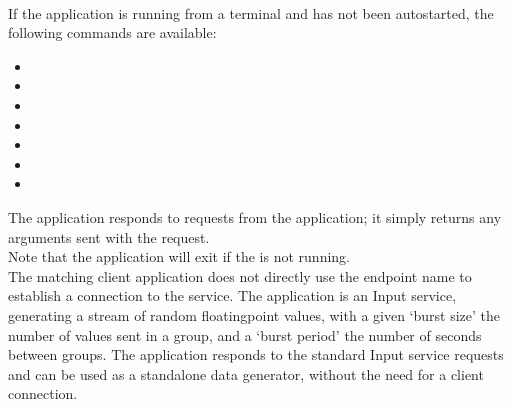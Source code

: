 \insertAppParameters{}
\insertOutputServiceComment{}\\

If the application is running from a terminal and has not been autostarted, the following
commands are available:
\begin{itemize}
\item{}
\item\exSp{}
\item\exSp{}
\item\exSp{}
\item\exSp{}
\item\exSp{}
\item\exSp{}
\end{itemize}
The  application responds to
 requests from the
 application; it simply returns any arguments
sent with the request.\\

Note that the application will exit if the
 is not running.\\

\insertAutoAppParameters{}
The matching client application does not directly use the endpoint name to establish a
connection to the service.
The  application is an Input service,
generating a stream of random floating\longDash{}point values, with a given `burst size'
\longDash{} the number of values sent in a group, and a `burst period' \longDash{} the
number of seconds between groups.
The application responds to the standard Input service requests and can be used as a
standalone data generator, without the need for a client connection.\\

